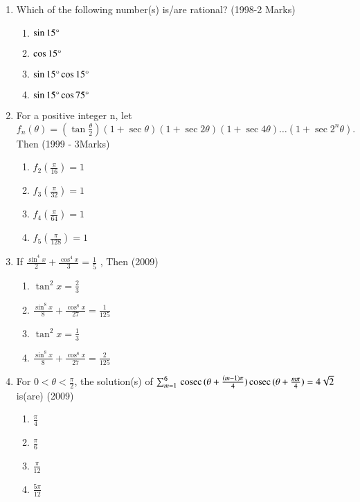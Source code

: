 \documentclass[journal,12pt,twocolumn]{IEEEtran}
\theoremstyle{remark}
\begin{document}
\begin{enumerate}
\item Which of the following number(s) is/are rational? \hfill(1998-2 Marks) 
\begin{enumerate}
    \item $\sin{15}\degree$
    \item $\cos{15}\degree$
    \item $\sin{15}\degree \cos{15}\degree$
    \item $\sin{15}\degree \cos{75}\degree$
\end{enumerate}
\item For a positive integer n, let \ 
$f_n(\theta) = (\tan\frac{\theta}{2})(1+\sec{\theta})(1+\sec{2\theta})(1+\sec4\theta)\dots(1+\sec2^n{\theta}).$ Then \hfill(1999 - 3Marks)
\begin{enumerate}
    \item $f_2(\frac{\pi}{16}) = 1$
    \item $f_3(\frac{\pi}{32}) = 1$
    \item $f_4(\frac{\pi}{64}) = 1$
    \item $f_5(\frac{\pi}{128}) = 1$
\end{enumerate}
\item If $\frac{\sin^4{x}}{2}+\frac{\cos^4{x}}{3}=\frac{1}{5}$ , Then \hfill(2009) 
\begin{enumerate}
    \item $\tan^2{x}=\frac{2}{3}$
    \item $\frac{\sin^8{x}}{8}+\frac{\cos^8{x}}{27}=\frac{1}{125}$
    \item $\tan^2{x}=\frac{1}{3}$
    \item $\frac{\sin^8{x}}{8}+\frac{\cos^8{x}}{27}=\frac{2}{125}$
\end{enumerate}
\item For $ 0<\theta <\frac{\pi}{2}$, the solution(s) of $\sum_{m=1}^{6}\,\text{cosec}\,{(\theta+\frac{(m-1)\pi}{4})}\,\text{cosec}\,{{(\theta}+\frac{m\pi}{4}) }= 4\sqrt{2}$ is(are) \hfill(2009) 
\begin{enumerate}
    \item $\frac{\pi}{4}$
    \item $\frac{\pi}{6}$
    \item $\frac{\pi}{12}$
    \item $\frac{5\pi}{12}$
\end{enumerate}


\end{enumerate}
\end{document}

